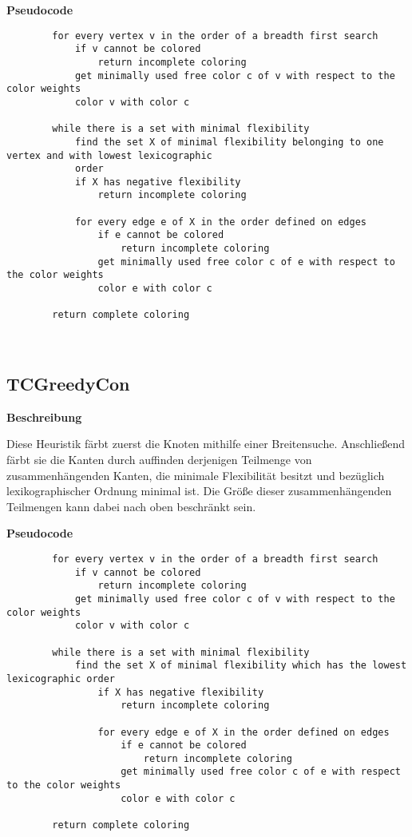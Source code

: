 \documentclass{article}
\begin{document}
	\textbf{Pseudocode}
	\begin{verbatim}
		for every vertex v in the order of a breadth first search
		    if v cannot be colored
		        return incomplete coloring
		    get minimally used free color c of v with respect to the color weights
		    color v with color c
				    
		while there is a set with minimal flexibility
		    find the set X of minimal flexibility belonging to one vertex and with lowest lexicographic 
		    order
		    if X has negative flexibility
		        return incomplete coloring
		        
		    for every edge e of X in the order defined on edges
		        if e cannot be colored
		            return incomplete coloring
		        get minimally used free color c of e with respect to the color weights
		        color e with color c
				        
		return complete coloring
	\end{verbatim}
	
	~\newpage
	
	\subsection{TCGreedyCon}
	
	\textbf{Beschreibung}
	
	Diese Heuristik färbt zuerst die Knoten mithilfe einer Breitensuche. Anschließend färbt sie die Kanten durch auffinden derjenigen Teilmenge von zusammenhängenden Kanten, die minimale Flexibilität besitzt und bezüglich lexikographischer Ordnung minimal ist. Die Größe dieser zusammenhängenden Teilmengen kann dabei nach oben beschränkt sein.
	
	\textbf{Pseudocode}
	\begin{verbatim}
		for every vertex v in the order of a breadth first search
		    if v cannot be colored
		        return incomplete coloring
		    get minimally used free color c of v with respect to the color weights
		    color v with color c
				    
		while there is a set with minimal flexibility
		    find the set X of minimal flexibility which has the lowest lexicographic order
		        if X has negative flexibility
		            return incomplete coloring
		            
		        for every edge e of X in the order defined on edges
		            if e cannot be colored
		                return incomplete coloring
		            get minimally used free color c of e with respect to the color weights
		            color e with color c
				        
		return complete coloring
	\end{verbatim}	
	
\end{document}
